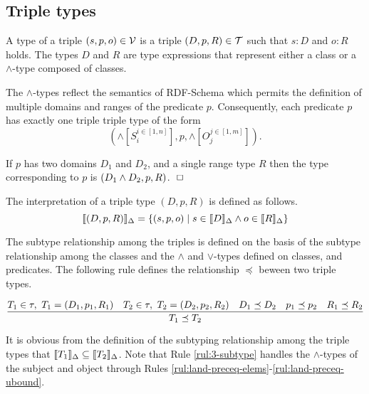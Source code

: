 \documentclass[runningheads]{llncs}
\newcommand{\llb}{\llbracket}
\newcommand{\rrb}{\rrbracket}
\newcommand{\V}{{\cal V}}
\newcommand{\T}{{\cal T}}
\newcommand{\finbox}{\phantom{.}\hfill\Box}
\begin{document}






\subsection{Triple types\label{sec:3-types}}

A type of a triple $(s,p,o)\in\V$ is a triple $(D,p,R)\in\T$ such that
$s:D$ and $o:R$ holds. The types $D$ and $R$ are type expressions that
represent either a class or a $\land$-type composed of classes.

The $\land$-types reflect the semantics of RDF-Schema \cite{rdfschema}
which permits the definition of multiple domains and ranges of the
predicate $p$. Consequently, each predicate $p$ has exactly one triple
triple type of the form
$$(\land[S_i^{i\in[1,n]}],p,\land[O_j^{j\in[1,m]}]).$$

\begin{example}
  If $p$ has two domains $D_1$ and $D_2$, and a single
range type $R$ then the type corresponding to $p$ is
$(D_1\land\/D_2,p,R)$. $\finbox$
\end{example}

\noindent
The interpretation of a triple type $(D,p,R)$ is defined as
follows.
$$\llb(D,p,R)\rrb_\Delta=\{(s,p,o)\mid\/s\in\llb\/D\rrb_\Delta\land\/o\in\llb\/R\rrb_\Delta \}$$

The subtype relationship among the triples is defined on the basis of
the subtype relationship among the classes and the $\land$ and
$\lor$-types defined on classes, and predicates. The following rule
defines the relationship $\preceq$ beween two triple types.

\begin{equation}
\label{rul:3-subtype}
\dfrac{T_1\in\tau,\ T_1=(D_1,p_1,R_1)\quad T_2\in\tau,\ T_2=(D_2,p_2,R_2)\quad\/D_1\preceq\/D_2\quad\/p_1\preceq\/p_2\quad\/R_1\preceq\/R_2}
      {T_1\preceq\/T_2}
\end{equation}

It is obvious from the definition of the subtyping relationship among
the triple types that
$\llb\/T_1\rrb_\Delta\subseteq\llb\/T_2\rrb_\Delta$. Note that Rule
\ref{rul:3-subtype} handles the $\land$-types of the subject and
object through Rules
\ref{rul:land-preceq-elems}-\ref{rul:land-preceq-ubound}.
\end{document}
